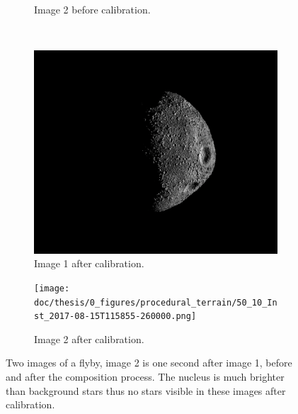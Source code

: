 \begin{figure}[htb]
\begin{subfigure}[b]{0.48\textwidth}
                \caption{Image 2 before calibration.}
                \label{fig:composition_before_2}
        \end{subfigure}
        \\
        \begin{subfigure}[b]{0.48\textwidth}
            \centering
                \includegraphics[width=\textwidth]{doc/thesis/0_figures/procedural_terrain/50_10_Inst_2017-08-15T115755-845000.png}
                \caption{Image 1 after calibration.}
                \label{fig:composition_after_1}
        \end{subfigure}
        \begin{subfigure}[b]{0.48\textwidth}
            \centering
                \texttt{[image: doc/thesis/0\_figures/procedural\_terrain/50\_10\_Inst\_2017-08-15T115855-260000.png]}
                \caption{Image 2 after calibration.}
                \label{fig:composition_after_2}
        \end{subfigure}
        \caption{Two images of a flyby, image 2 is one second after image 1, before and after the composition process. The nucleus is much brighter than background stars thus no stars visible in these images after calibration.}
        \label{fig:composition_before_after}
\end{figure}



